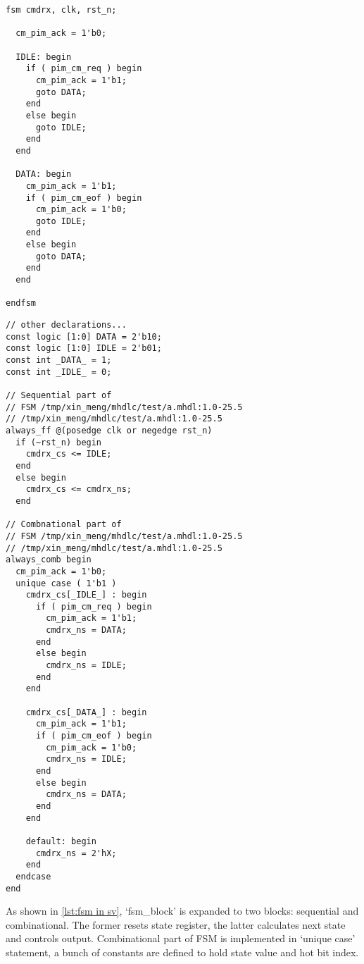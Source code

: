\begin{minipage}[t]{.45\textwidth}
\begin{lstlisting}[caption={FSM in \mhdl}, label={lst:fsm in mhdl}]
fsm cmdrx, clk, rst_n;

  cm_pim_ack = 1'b0;
  
  IDLE: begin
    if ( pim_cm_req ) begin
      cm_pim_ack = 1'b1;
      goto DATA;
    end
    else begin
      goto IDLE;
    end
  end

  DATA: begin
    cm_pim_ack = 1'b1;
    if ( pim_cm_eof ) begin
      cm_pim_ack = 1'b0;
      goto IDLE;
    end
    else begin
      goto DATA;
    end
  end

endfsm
\end{lstlisting}
\end{minipage}
\hspace{1ex}
\begin{minipage}[t]{.5\textwidth}
\begin{lstlisting}[caption={FSM in \sv}, label={lst:fsm in sv}]
// other declarations...
const logic [1:0] DATA = 2'b10;
const logic [1:0] IDLE = 2'b01;
const int _DATA_ = 1;
const int _IDLE_ = 0;

// Sequential part of 
// FSM /tmp/xin_meng/mhdlc/test/a.mhdl:1.0-25.5
// /tmp/xin_meng/mhdlc/test/a.mhdl:1.0-25.5
always_ff @(posedge clk or negedge rst_n)
  if (~rst_n) begin
    cmdrx_cs <= IDLE;
  end
  else begin
    cmdrx_cs <= cmdrx_ns;
  end

// Combnational part of
// FSM /tmp/xin_meng/mhdlc/test/a.mhdl:1.0-25.5
// /tmp/xin_meng/mhdlc/test/a.mhdl:1.0-25.5
always_comb begin
  cm_pim_ack = 1'b0;
  unique case ( 1'b1 )
    cmdrx_cs[_IDLE_] : begin
      if ( pim_cm_req ) begin
        cm_pim_ack = 1'b1;
        cmdrx_ns = DATA;
      end
      else begin
        cmdrx_ns = IDLE;
      end
    end

    cmdrx_cs[_DATA_] : begin
      cm_pim_ack = 1'b1;
      if ( pim_cm_eof ) begin
        cm_pim_ack = 1'b0;
        cmdrx_ns = IDLE;
      end
      else begin
        cmdrx_ns = DATA;
      end
    end

    default: begin
      cmdrx_ns = 2'hX;
    end
  endcase
end
\end{lstlisting}
\end{minipage}

As shown in \autoref{lst:fsm in sv}, `fsm\_block' is expanded to two blocks: sequential 
and combinational. The former resets state register, the latter calculates next state and 
controls output. Combinational part of FSM is implemented in `unique case' statement, a bunch 
of constants are defined to hold state value and hot bit index. 
